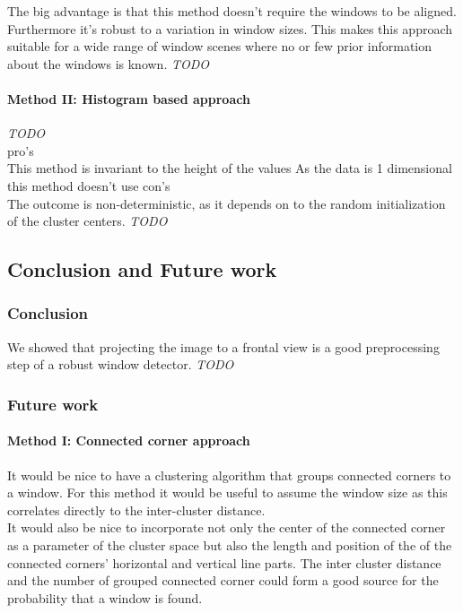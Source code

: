 The big advantage is that this method doesn't require the windows to be aligned.
Furthermore it's robust to a variation in window sizes. This makes this approach suitable
for a wide range of window scenes where no or few prior information about the
	windows is known.
\emph{TODO}


\paragraph{Method II: Histogram based approach} 
\emph{TODO}\\
pro's \\
This method is invariant to the height of the values
As the data is 1 dimensional this method doesn't use 
con's\\
The outcome is non-deterministic, as it depends on to the random initialization of the cluster centers.
\emph{TODO}\\



\subsection{Conclusion and Future work}
\subsubsection{Conclusion}
We showed that projecting the image to a frontal view is a good preprocessing
step of a robust window detector.
\emph{TODO}

\subsubsection{Future work}
\paragraph{Method I: Connected corner approach} 
It would be nice to have a clustering algorithm that groups connected corners to
a window. For this method it would be useful to assume the window size as this
correlates directly to the inter-cluster distance.\\

It would also be nice to incorporate not only the center of the connected corner
as a parameter of the cluster space but also the length and position of the of
the connected corners' horizontal and vertical line parts.  The inter cluster
distance and the number of grouped connected corner could form a good source for
the probability that a window is found.

